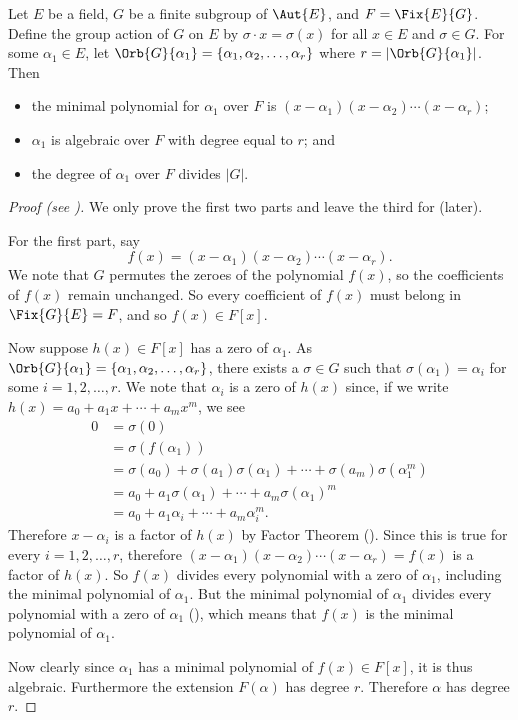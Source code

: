 \begin{theorem}\label{thrm-degree-of-element-under-fixed-field-action}
    Let $E$ be a field, $G$ be a finite subgroup of $\Aut{E}$, and $F = \Fix{E}{G}$. Define the group action of $G$ on $E$ by $\sigma \cdot x = \sigma(x)$ for all $x \in E$ and $\sigma \in G$. For some $\alpha_1 \in E$, let $\Orb{G}{\alpha_1} = \{\alpha_1, \alpha_2, \dots, \alpha_r\}$ where $r = |\Orb{G}{\alpha_1}|$. Then
    \begin{itemize}
        \item the minimal polynomial for $\alpha_1$ over $F$ is $(x-\alpha_1)(x-\alpha_2)\cdots(x-\alpha_r)$;
        \item $\alpha_1$ is algebraic over $F$ with degree equal to $r$; and
        \item the degree of $\alpha_1$ over $F$ divides $|G|$.
    \end{itemize}
\end{theorem}
\begin{proof}[Proof (see {\cite[Theorem 16.5.2]{artin_2011}})]
    We only prove the first two parts and leave the third for  (later).
    
    For the first part, say
    \[
        f(x) = (x-\alpha_1)(x-\alpha_2)\cdots(x-\alpha_r).
    \]
    We note that $G$ permutes the zeroes of the polynomial $f(x)$, so the coefficients of $f(x)$ remain unchanged. So every coefficient of $f(x)$ must belong in $\Fix{G}{E} = F$, and so $f(x) \in F[x]$.

    Now suppose $h(x) \in F[x]$ has a zero of $\alpha_1$. As $\Orb{G}{\alpha_1} = \{\alpha_1, \alpha_2, \dots, \alpha_r\}$, there exists a $\sigma \in G$ such that $\sigma(\alpha_1) = \alpha_i$ for some $i = 1, 2, \dots, r$. We note that $\alpha_i$ is a zero of $h(x)$ since, if we write $h(x) = a_0 + a_1x + \cdots + a_mx^m$, we see
    \begin{align*}
        0 &= \sigma(0)\\
        &= \sigma(f(\alpha_1))\\
        &= \sigma(a_0) + \sigma(a_1)\sigma(\alpha_1) + \cdots + \sigma(a_m)\sigma(\alpha_1^m)\\
        &= a_0 + a_1\sigma(\alpha_1) + \cdots + a_m\sigma(\alpha_1)^m\\
        &= a_0 + a_1\alpha_i + \cdots + a_m\alpha_i^m.
    \end{align*}
    Therefore $x - \alpha_i$ is a factor of $h(x)$ by Factor Theorem (). Since this is true for every $i = 1, 2, \dots, r$, therefore $(x-\alpha_1)(x-\alpha_2)\cdots(x-\alpha_r) = f(x)$ is a factor of $h(x)$. So $f(x)$ divides every polynomial with a zero of $\alpha_1$, including the minimal polynomial of $\alpha_1$. But the minimal polynomial of $\alpha_1$ divides every polynomial with a zero of $\alpha_1$ (), which means that $f(x)$ is the minimal polynomial of $\alpha_1$.

    Now clearly since $\alpha_1$ has a minimal polynomial of $f(x) \in F[x]$, it is thus algebraic. Furthermore the extension $F(\alpha)$ has degree $r$. Therefore $\alpha$ has degree $r$.
\end{proof}

